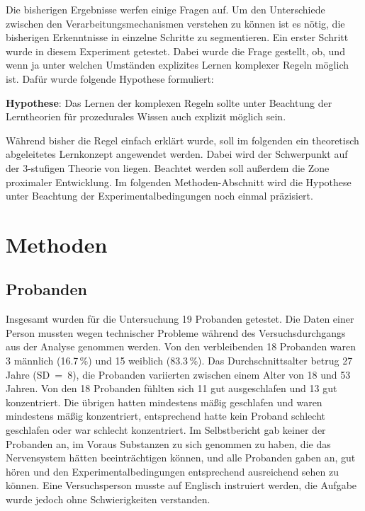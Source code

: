 \documentclass[doc,a4paper,12pt]{apa6}
\begin{document}
Die bisherigen Ergebnisse werfen einige Fragen auf. Um den Unterschiede zwischen den Verarbeitungsmechanismen verstehen zu können ist es nötig, die bisherigen Erkenntnisse in einzelne Schritte zu segmentieren. Ein erster Schritt wurde in diesem Experiment getestet. Dabei wurde die Frage gestellt, ob, und wenn ja unter welchen Umständen explizites Lernen komplexer Regeln möglich ist. Dafür wurde folgende Hypothese formuliert:

\textbf{Hypothese}: Das Lernen der komplexen Regeln sollte unter Beachtung der Lerntheorien für prozedurales Wissen auch explizit möglich sein.

Während bisher die Regel einfach erklärt wurde, soll im folgenden ein theoretisch abgeleitetes Lernkonzept angewendet werden. Dabei wird der Schwerpunkt auf der 3-stufigen Theorie von \textcite{fitts1967human} liegen. Beachtet werden soll außerdem die Zone proximaler Entwicklung. Im folgenden Methoden-Abschnitt wird die Hypothese unter Beachtung der Experimentalbedingungen noch einmal präzisiert.

\section{Methoden}

\subsection{Probanden}

Insgesamt wurden für die Untersuchung 19 Probanden getestet. Die Daten einer Person mussten wegen technischer Probleme während des Versuchsdurchgangs aus der Analyse genommen werden. Von den verbleibenden 18 Probanden waren 3 männlich (16.7\,\%) und 15 weiblich (83.3\,\%). Das Durchschnittsalter betrug 27 Jahre (SD~=~8), die Probanden variierten zwischen einem Alter von 18 und 53 Jahren. Von den 18 Probanden fühlten sich 11 gut ausgeschlafen und 13 gut konzentriert. Die übrigen hatten mindestens mäßig geschlafen und waren mindestens mäßig konzentriert, entsprechend hatte kein Proband schlecht geschlafen oder war schlecht konzentriert. Im Selbstbericht gab keiner der Probanden an, im Voraus Substanzen zu sich genommen zu haben, die das Nervensystem hätten beeinträchtigen können, und alle Probanden gaben an, gut hören und den Experimentalbedingungen entsprechend ausreichend sehen zu können. Eine Versuchsperson musste auf Englisch instruiert werden, die Aufgabe wurde jedoch ohne Schwierigkeiten verstanden.
\end{document}
